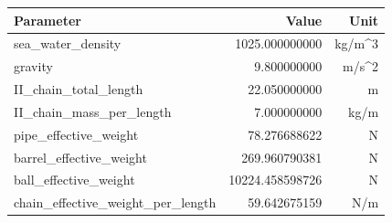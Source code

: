 \begin{tabular}{lrr}
\toprule
Parameter & Value & Unit \\
\midrule
sea_water_density & 1025.000000000 & kg/m^3 \\
gravity & 9.800000000 & m/s^2 \\
II_chain_total_length & 22.050000000 & m \\
II_chain_mass_per_length & 7.000000000 & kg/m \\
pipe_effective_weight & 78.276688622 & N \\
barrel_effective_weight & 269.960790381 & N \\
ball_effective_weight & 10224.458598726 & N \\
chain_effective_weight_per_length & 59.642675159 & N/m \\
\bottomrule
\end{tabular}
